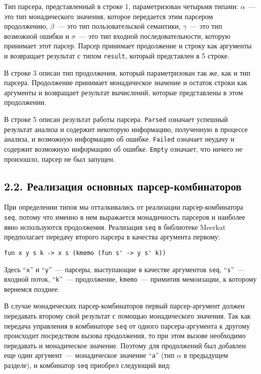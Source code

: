 Тип парсера, представленный в строке 1, параметризован четырьмя типами: $\alpha$~--- это тип монадического значения, которое передается этим парсером продолжению, $\beta$~--- это тип пользовательской семантики, $\gamma$~--- это тип возможной ошибки и $\sigma$~--- это тип входной последовательности, которую принимает этот парсер. Парсер принимает продолжение и строку как аргументы и возвращает результат с типом \lstinline|result|, который представлен в 5 строке.

В строке 3 описан тип продолжения, который параметризован так же, как и тип парсера. Продолжение принимает монадическое значение и остаток строки как аргументы и возвращает результат вычислений, которые представлены в этом продолжении.

В строке 5 описан результат работы парсера. \lstinline|Parsed| означает успешный результат анализа и содержит некоторую информацию, полученную в процессе
анализа, и возможную информацию об ошибке. \lstinline|Failed| означает неудачу и содержит возможную информацию об ошибке. \lstinline|Empty| означает, что ничего не произошло, парсер не был запущен.

\subsection*{2.2. Реализация основных парсер-комбинаторов}

При определении типов мы отталкивались от реализации парсер-комбинатора \lstinline|seq|, потому что именно в нем выражается монадичность парсеров и наиболее явно используются продолжения. Реализация \lstinline|seq| в библиотеке Meerkat предполагает передачу второго парсера в качества аргумента первому:

\begin{lstlisting}[basicstyle=\small, numbers=none]
   fun x y s k -> x s (kmemo (fun s' -> y s' k))
\end{lstlisting}

Здесь ``\lstinline|x|'' и ``\lstinline|y|''~--- парсеры, выступающие в качестве аргументов \lstinline|seq|, ``\lstinline|s|''~--- входной поток, ``\lstinline|k|''~--- продолжение, \lstinline|kmemo|~--- примитив мемоизации, к которому вернемся позднее.

В случае монадических парсер-комбинаторов первый парсер-аргумент должен передавать второму свой результат с помощью монадического значения. Так как передача управления в комбинаторе \lstinline|seq| от одного парсера-аргумента к другому происходит посредством вызова продолжения, то при этом вызове необходимо передавать и монадическое значение. Поэтому для продолжений был добавлен еще один аргумент~--- монадическое значение ``\lstinline|a|'' (тип $\alpha$ в предыдущем разделе), и комбинатор \lstinline|seq| приобрел следующий вид:


